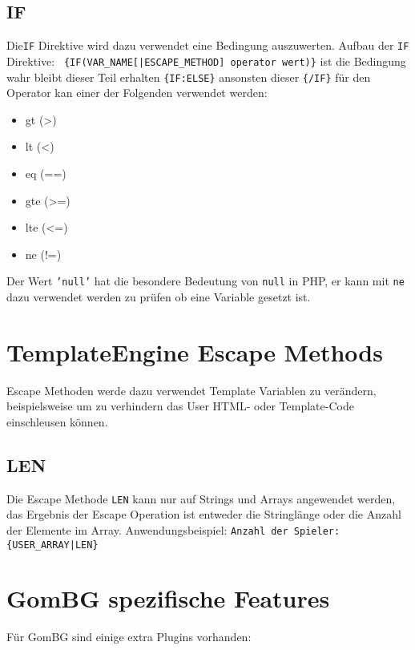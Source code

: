 \documentclass[a4paper,10pt]{article}
\begin{document}
\subsection{IF}
Die{\tt IF} Direktive wird dazu verwendet eine Bedingung auszuwerten.
Aufbau der {\tt IF} Direktive:\newline
{\tt
\{IF(VAR\_NAME[|ESCAPE\_METHOD] operator wert)\}}\newline
 ist die Bedingung wahr bleibt dieser Teil erhalten\newline
 {\tt \{IF:ELSE\}}\newline
 ansonsten dieser\newline
{\tt \{/IF\}}\newline
f\"ur den Operator kan einer der Folgenden verwendet werden:
\begin{itemize}
  \item gt (\textgreater)
  \item lt (\textless)
  \item eq (==)
  \item gte (\textgreater=)
  \item lte (\textless=)
  \item ne (!=)
\end{itemize}
Der Wert {\tt 'null'} hat die besondere Bedeutung von {\tt null} in PHP,
er kann mit {\tt ne} dazu verwendet werden zu pr\"ufen ob eine Variable gesetzt ist.

\section{TemplateEngine Escape Methods}
Escape Methoden werde dazu verwendet Template Variablen zu ver\"andern, beispielsweise
um zu verhindern das User HTML- oder Template-Code einschleusen k\"onnen.

\subsection{LEN}
Die Escape Methode {\tt LEN} kann nur auf Strings und Arrays angewendet werden, das
Ergebnis der Escape Operation ist entweder die Stringl\"ange oder die Anzahl der
Elemente im Array.\newline
Anwendungsbeispiel:\newline
{\tt Anzahl der Spieler: \{USER\_ARRAY|LEN\}}


\section{GomBG spezifische Features}
F\"ur GomBG sind einige extra Plugins vorhanden:
\end{document}
